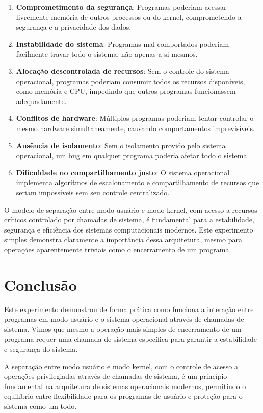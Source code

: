 \documentclass[12pt,a4paper]{article}
\begin{document}
\begin{enumerate}
    \item \textbf{Comprometimento da segurança}: Programas poderiam acessar livremente memória de outros processos ou do kernel, comprometendo a segurança e a privacidade dos dados.

    \item \textbf{Instabilidade do sistema}: Programas mal-comportados poderiam facilmente travar todo o sistema, não apenas a si mesmos.

    \item \textbf{Alocação descontrolada de recursos}: Sem o controle do sistema operacional, programas poderiam consumir todos os recursos disponíveis, como memória e CPU, impedindo que outros programas funcionassem adequadamente.

    \item \textbf{Conflitos de hardware}: Múltiplos programas poderiam tentar controlar o mesmo hardware simultaneamente, causando comportamentos imprevisíveis.

    \item \textbf{Ausência de isolamento}: Sem o isolamento provido pelo sistema operacional, um bug em qualquer programa poderia afetar todo o sistema.

    \item \textbf{Dificuldade no compartilhamento justo}: O sistema operacional implementa algoritmos de escalonamento e compartilhamento de recursos que seriam impossíveis sem seu controle centralizado.
\end{enumerate}

O modelo de separação entre modo usuário e modo kernel, com acesso a recursos críticos controlado por chamadas de sistema, é fundamental para a estabilidade, segurança e eficiência dos sistemas computacionais modernos. Este experimento simples demonstra claramente a importância dessa arquitetura, mesmo para operações aparentemente triviais como o encerramento de um programa.

\section{Conclusão}

Este experimento demonstrou de forma prática como funciona a interação entre programas em modo usuário e o sistema operacional através de chamadas de sistema. Vimos que mesmo a operação mais simples de encerramento de um programa requer uma chamada de sistema específica para garantir a estabilidade e segurança do sistema.

A separação entre modo usuário e modo kernel, com o controle de acesso a operações privilegiadas através de chamadas de sistema, é um princípio fundamental na arquitetura de sistemas operacionais modernos, permitindo o equilíbrio entre flexibilidade para os programas de usuário e proteção para o sistema como um todo.
\end{document}
